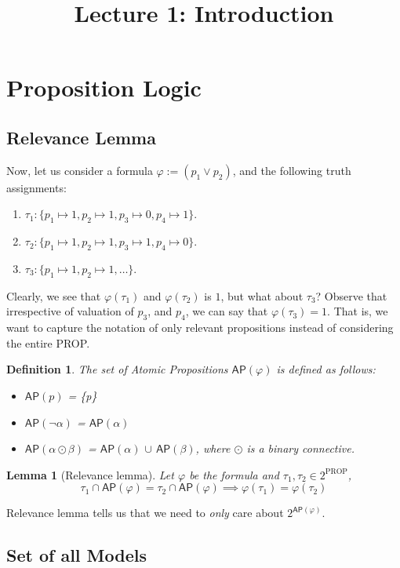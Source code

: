 \documentclass{article}
\newtheorem{lemma}[theorem]{Lemma}
\newtheorem{definition}[theorem]{Definition}
\newcommand{\ap}[1]{\ensuremath{\mathsf{AP}{#1}}}
\begin{document}
\title{Lecture 1: Introduction}

\section{Proposition Logic}

\subsection{Relevance Lemma}
Now, let us consider a formula $\varphi:= (p_1 \lor p_2)$, and the following truth assignments:
\begin{enumerate}
	\item $\tau_1: \{p_1 \mapsto 1, p_2 \mapsto 1, p_3 \mapsto 0, p_4 \mapsto 1 \}$.
	\item $\tau_2: \{p_1 \mapsto 1, p_2 \mapsto 1, p_3 \mapsto 1, p_4 \mapsto 0 \}$.
	\item $\tau_3: \{p_1 \mapsto 1, p_2 \mapsto 1, \ldots\}$.
\end{enumerate}

Clearly, we see that $\varphi(\tau_1)$ and $\varphi(\tau_2)$ is $1$, but what about $\tau_3$? Observe that irrespective of valuation of $p_3$, and $p_4$, we can say that $\varphi(\tau_3) = 1$. That is, we want to capture the notation of only relevant propositions instead of considering the entire PROP.

\begin{definition}
	The set of Atomic Propositions \ap{(\varphi)} is defined as follows:
	\begin{itemize}
		\item \ap{(p)} = \{p\}
		\item \ap{(\lnot \alpha)} = \ap{(\alpha)}
		\item \ap{(\alpha \odot \beta)} = \ap{(\alpha)} $\cup$ \ap{(\beta)},  where $\odot$ is a binary connective.
	\end{itemize}
\end{definition}

\begin{lemma}[Relevance lemma]
	Let $\varphi$ be the formula and $\tau_1, \tau_2 \in 2^{\text{PROP}}$, $$\tau_1 \cap \ap{(\varphi)} = \tau_2 \cap \ap{(\varphi)} \implies \varphi(\tau_1) = \varphi(\tau_2)$$
\end{lemma}

Relevance lemma tells us that we need to \textit{only} care about $2^{\ap{(\varphi)}}$.

\subsection{Set of all Models}
\end{document}

